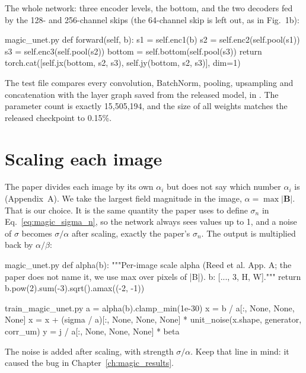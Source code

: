 The whole network: three encoder levels, the bottom, and the two decoders fed by the 128- and 256-channel skips (the
64-channel skip is left out, as in Fig.~1b):

\begin{code*}{magic_unet.py}
    def forward(self, b):
        s1 = self.enc1(b)
        s2 = self.enc2(self.pool(s1))
        s3 = self.enc3(self.pool(s2))
        bottom = self.bottom(self.pool(s3))
        return torch.cat([self.jx(bottom, s2, s3), self.jy(bottom, s2, s3)], dim=1)
\end{code*}

\begin{keyidea}
The test file compares every convolution, BatchNorm, pooling, upsampling and concatenation with the layer graph saved
from the released model, in . The parameter count is exactly
15,505,194, and the size of all weights matches the released checkpoint to 0.15\%.
\end{keyidea}

\section{Scaling each image}

The paper divides each image by its own $\alpha_i$ but does not say which number $\alpha_i$ is (Appendix~A). We take the
largest field magnitude in the image, $\alpha = \max|\bm B|$. That is our choice. It is the same quantity the paper uses
to define $\sigma_n$ in Eq.~\eqref{eq:magic_sigma_n}, so the network always sees values up to 1, and a noise of $\sigma$
becomes $\sigma/\alpha$ after scaling, exactly the paper's $\sigma_n$. The output is multiplied back by $\alpha/\beta$:

\begin{code*}{magic_unet.py}
def alpha(b):
    """Per-image scale alpha (Reed et al. App. A; the paper does not name it, we use max over pixels of |B|). b: [..., 3, H, W]."""
    return b.pow(2).sum(-3).sqrt().amax((-2, -1))
\end{code*}

\begin{code*}{train_magic_unet.py}
    a = alpha(b).clamp_min(1e-30)
    x = b / a[:, None, None, None]
    x = x + (sigma / a)[:, None, None, None] * unit_noise(x.shape, generator, corr_um)
    y = j / a[:, None, None, None] * beta
\end{code*}

The noise is added after scaling, with strength $\sigma/\alpha$. Keep that line in mind: it caused the bug in
Chapter~\ref{ch:magic_results}.

